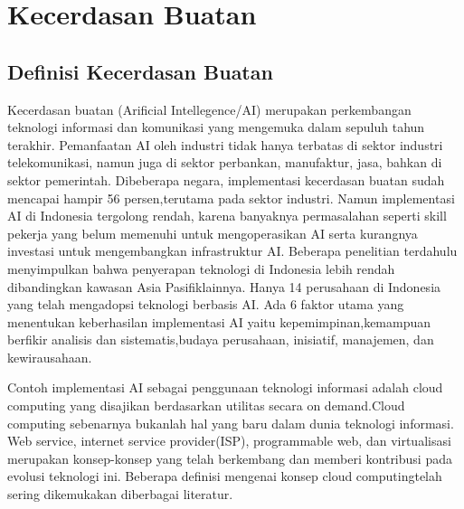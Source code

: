 \section{Kecerdasan Buatan}
\subsection{Definisi Kecerdasan Buatan}
 \hspace{1cm} Kecerdasan  buatan  (Arificial  Intellegence/AI) merupakan   perkembangan   teknologi   informasi   dan komunikasi  yang  mengemuka  dalam  sepuluh  tahun terakhir.  Pemanfaatan  AI  oleh  industri  tidak  hanya terbatas di sektor industri telekomunikasi, namun juga di sektor perbankan, manufaktur, jasa, bahkan di sektor pemerintah.    Dibeberapa negara, implementasi kecerdasan   buatan   sudah   mencapai   hampir 56 persen,terutama  pada  sektor  industri. Namun   implementasi   AI   di Indonesia    tergolong   rendah, karena banyaknya permasalahan seperti skill pekerja yang belum memenuhi  untuk  mengoperasikan  AI  serta  kurangnya investasi   untuk   mengembangkan   infrastruktur   AI. Beberapa  penelitian  terdahulu  menyimpulkan  bahwa penyerapan   teknologi di Indonesia lebih rendah dibandingkan kawasan Asia Pasifiklainnya. Hanya 14 perusahaan di Indonesia yang telah mengadopsi teknologi berbasis AI. Ada 6 faktor utama yang  menentukan  keberhasilan implementasi  AI  yaitu kepemimpinan,kemampuan berfikir analisis dan sistematis,budaya  perusahaan, inisiatif, manajemen, dan kewirausahaan.
 
\hspace{1cm}Contoh  implementasi  AI  sebagai  penggunaan teknologi informasi adalah cloud computing yang disajikan berdasarkan utilitas secara on demand.Cloud computing sebenarnya  bukanlah  hal  yang  baru  dalam dunia   teknologi informasi. Web   service, internet service provider(ISP), programmable web,   dan virtualisasi   merupakan   konsep-konsep   yang   telah berkembang   dan   memberi   kontribusi   pada   evolusi teknologi ini. Beberapa definisi mengenai konsep cloud computingtelah   sering   dikemukakan   diberbagai literatur.

